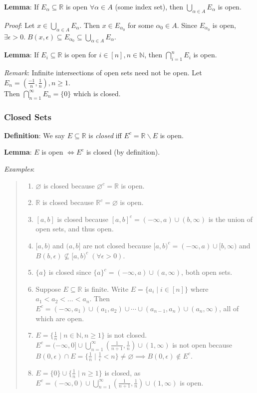 \documentclass[11pt]{article}
\begin{document}
\textbf{Lemma}: If $E_\alpha \subseteq \mathbb{R}$ is open $\forall \alpha \in A$ (some index set), then $\bigcup_{\alpha \in A} E_\alpha$ is open.

\emph{Proof}: Let $x \in \bigcup_{\alpha \in A} E_\alpha$. Then $x \in E_{\alpha_0}$ for some $\alpha_0 \in A$. Since $E_{\alpha_0}$ is open, $\exists \epsilon > 0.\; B(x, \epsilon) \subseteq E_{\alpha_0} \subseteq \bigcup_{\alpha \in A} E_\alpha$.

\textbf{Lemma}: If $E_i \subseteq \mathbb{R}$ is open for $i \in [n], n \in \mathbb{N}$, then $\bigcap_{i=1}^n E_i$ is open.

\emph{Remark}: Infinite intersections of open sets need not be open. Let $E_n = (\frac{-1}{n}, \frac{1}{n}), n \geq 1$.\\
Then $\bigcap_{n=1}^\infty E_n = \{0\}$ which is closed.

\subsubsection{Closed Sets}

\textbf{Definition}: We say $E \subseteq \mathbb{R}$ is \emph{closed} iff $E^c = \mathbb{R} \backslash E$ is open.

\textbf{Lemma}: $E$ is open $\iff E^c$ is closed (by definition).

\emph{Examples}:
\begin{quote}\vspace{-0.3cm}
	\begin{enumerate}
	\item $\varnothing$ is closed because $\varnothing^c = \mathbb{R}$ is open.
	\item $\mathbb{R}$ is closed because $\mathbb{R}^c = \varnothing$ is open.
	\item $[a,b]$ is closed because $[a,b]^c = (-\infty, a) \cup (b, \infty)$ is the union of open sets, and thus open.
	\item $[a,b)$ and $(a,b]$ are not closed because $[a,b)^c = (-\infty, a) \cup [b, \infty)$ and $B(b, \epsilon) \not \subseteq [a,b)^c \;(\forall \epsilon > 0)$.
	\item $\{a\}$ is closed since $\{a\}^c = (-\infty, a) \cup (a, \infty)$, both open sets.
	\item Suppose $E \subseteq \mathbb{R}$ is finite. Write $E = \{a_i \;|\; i \in [n]\}$ where $a_1 < a_2 < \ldots < a_n$. Then $E^c = (-\infty, a_1) \cup (a_1, a_2) \cup \cdots \cup (a_{n-1}, a_n) \cup (a_n, \infty)$, all of which are open.
	\item $E = \{\frac{1}{n} \;|\; n \in \mathbb{N}, n \geq 1\}$ is not closed. $E^c = (-\infty, 0] \cup \bigcup_{n=1}^\infty (\frac{1}{n+1}, \frac{1}{n}) \cup (1, \infty)$ is not open because $B(0, \epsilon) \cap E = \{\frac{1}{n} \;|\; \frac{1}{\epsilon} < n\} \neq \varnothing \implies B(0, \epsilon) \notin E^c$.
	\item $E = \{0\} \cup \{\frac{1}{n} \;|\; n \geq 1\}$ is closed, as $E^c = (-\infty, 0) \cup \bigcup_{n=1}^\infty (\frac{1}{n+1}, \frac{1}{n}) \cup (1, \infty)$ is open.
	\end{enumerate}
\end{quote}
\end{document}
